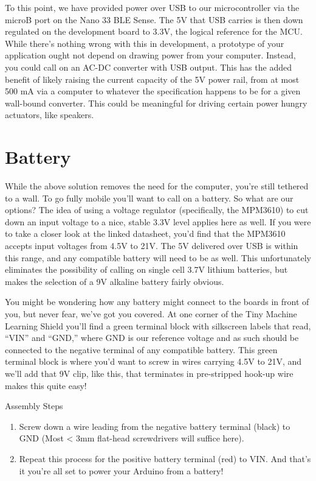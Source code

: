 To this point, we have provided power over USB to our microcontroller via the microB port on the Nano 33 BLE Sense. The 5V that USB carries is then down regulated on the development board to 3.3V, the logical reference for the MCU. While there’s nothing wrong with this in development, a prototype of your application ought not depend on drawing power from your computer. Instead, you could call on an AC-DC converter with USB output. This has the added benefit of likely raising the current capacity of the 5V power rail, from at most 500 mA via a computer to whatever the specification happens to be for a given wall-bound converter. This could be meaningful for driving certain power hungry actuators, like speakers.

\section{Battery}

While the above solution removes the need for the computer, you’re still tethered to a wall. To go fully mobile you’ll want to call on a battery. So what are our options? The idea of using a voltage regulator (specifically, the MPM3610) to cut down an input voltage to a nice, stable 3.3V level applies here as well. If you were to take a closer look at the linked datasheet, you’d find that the MPM3610 accepts input voltages from 4.5V to 21V. The 5V delivered over USB is within this range, and any compatible battery will need to be as well. This unfortunately eliminates the possibility of calling on single cell 3.7V lithium batteries, but makes the selection of a 9V alkaline battery fairly obvious.

You might be wondering how any battery might connect to the boards in front of you, but never fear, we’ve got you covered. At one corner of the Tiny Machine Learning Shield you’ll find a green terminal block with silkscreen labels that read, “VIN” and “GND,” where GND is our reference voltage and as such should be connected to the negative terminal of any compatible battery. This green terminal block is where you’d want to screw in wires carrying 4.5V to 21V, and we’ll add that 9V clip, like this, that terminates in pre-stripped hook-up wire makes this quite easy!

\bigskip

Assembly Steps

\begin{enumerate}
    \item Screw down a wire leading from the negative battery terminal (black) to GND (Most < 3mm flat-head screwdrivers will suffice here).
    \item Repeat this process for the positive battery terminal (red) to VIN. And that's it you're all set to power your Arduino from a battery!
\end{enumerate}


